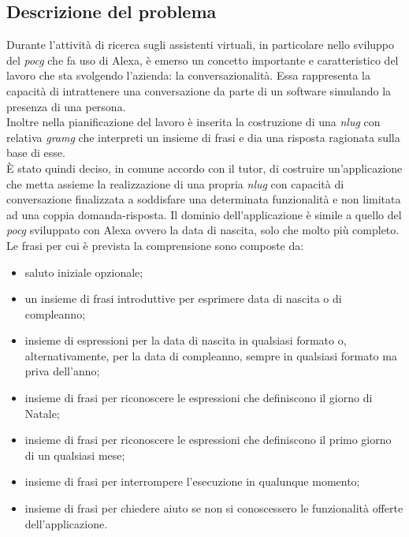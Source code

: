 	\subsection{Descrizione del problema}
	Durante l'attività di ricerca sugli assistenti virtuali, in particolare nello sviluppo del \emph{\gls{pocg}} che fa uso di Alexa, è emerso un concetto importante e caratteristico del lavoro che sta svolgendo l'azienda: la conversazionalità. Essa rappresenta la capacità di intrattenere una conversazione da parte di un software simulando la presenza di una persona. \\
	Inoltre nella pianificazione del lavoro è inserita la costruzione di una \emph{\gls{nlug}} con relativa \emph{\gls{gramg}} che interpreti un insieme di frasi e dia una risposta ragionata sulla base di esse. \\
	È stato quindi deciso, in comune accordo con il tutor, di costruire un'applicazione che metta assieme la realizzazione di una propria \emph{\gls{nlug}} con capacità di conversazione finalizzata a soddisfare una determinata funzionalità e non limitata ad una coppia domanda-risposta. Il dominio dell'applicazione è simile a quello del \emph{\gls{pocg}} sviluppato con Alexa ovvero la data di nascita, solo che molto più completo. \\
	Le frasi per cui è prevista la comprensione sono  composte da:
	\begin{itemize}
		\item saluto iniziale opzionale;
		\item un insieme di frasi introduttive per esprimere data di nascita o di compleanno;
		\item insieme di espressioni per la data di nascita in qualsiasi formato o, alternativamente, per la data di compleanno, sempre in qualsiasi formato ma priva dell'anno;
		\item insieme di frasi per riconoscere le espressioni che definiscono il giorno di Natale;
		\item insieme di frasi per riconoscere le espressioni che definiscono il primo giorno di un qualsiasi mese;
		\item insieme di frasi per interrompere l'esecuzione in qualunque momento;
		\item insieme di frasi per chiedere aiuto se non si conoscessero le funzionalità offerte dell'applicazione.
	\end{itemize}
